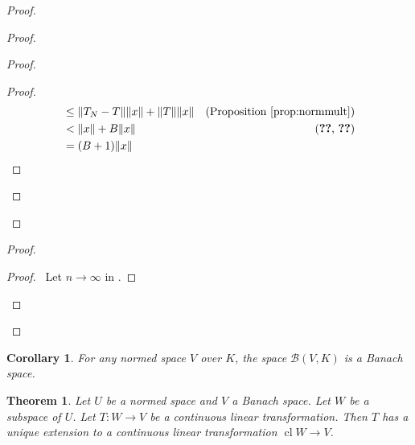 \documentclass{book}
\let\qed\relax
\newtheorem{cor}{Corollary}[ax]
\newtheorem{thm}[ax]{Theorem}
\theoremstyle{definition}
\newcommand{\cl}{\ensuremath{\operatorname{cl}}}
\begin{document}
\begin{proof}
\begin{proof}
\begin{proof}
\begin{proof}
\begin{align*}
				& \leq \|T_N - T\|\|x\| + \|T\| \|x\| & (\text{Proposition \ref{prop:normmult}}) \\
				& < \|x\| + B \|x\| & (\text{\stepref{i}, \stepref{ii}}) \\
				& = (B + 1) \|x\|
			\end{align*}
		\end{proof}
	\end{proof}
\end{proof}
\begin{proof}
	\begin{proof}
		\pf\ Let $n \rightarrow \infty$ in .
	\end{proof}
\end{proof}
\qed
\end{proof}

\begin{cor}
For any normed space $V$ over $K$, the space $\mathcal{B}(V,K)$ is a Banach space.
\end{cor}

\begin{thm}
Let $U$ be a normed space and $V$ a Banach space. Let $W$ be a subspace of $U$. Let $T : W \rightarrow V$ be a continuous linear transformation. Then $T$ has a unique extension to a continuous linear transformation $\cl W \rightarrow V$.
\end{thm}
\end{document}
